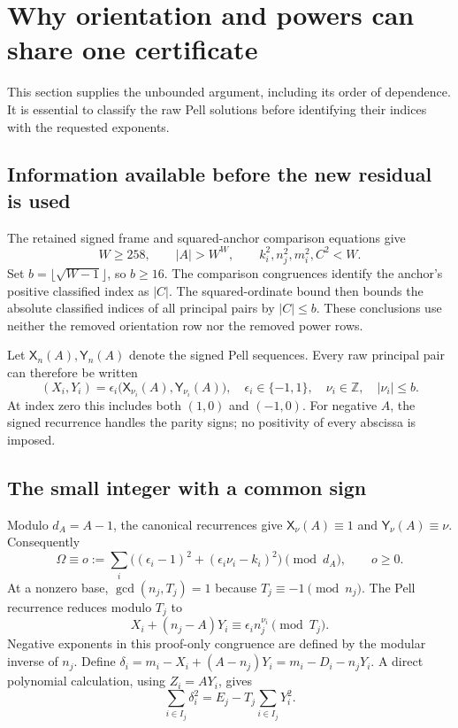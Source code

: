 \documentclass[11pt]{article}
\theoremstyle{definition}\newtheorem{definition}[theorem]{Definition}
\theoremstyle{remark}\newtheorem{remark}[theorem]{Remark}
\newcommand{\Z}{\mathbb Z}\newcommand{\N}{\mathbb N}
\begin{document}
\section{Why orientation and powers can share one certificate}
\label{sec:jointproof}

This section supplies the unbounded argument, including its order of
dependence. It is essential to classify the raw Pell solutions before
identifying their indices with the requested exponents.

\subsection{Information available before the new residual is used}
The retained signed frame and squared-anchor comparison equations give
\[
 W\geq258,\qquad |A|>W^W,\qquad
 k_i^2,n_j^2,m_i^2,C^2<W.
\]
Set $b=\lfloor\sqrt{W-1}\rfloor$, so $b\geq16$. The comparison
congruences identify the anchor's positive classified index as $|C|$.
The squared-ordinate bound then bounds the absolute classified indices
of all principal pairs by $|C|\leq b$. These conclusions use neither
the removed orientation row nor the removed power rows.

Let $\mathsf X_n(A),\mathsf Y_n(A)$ denote the signed Pell sequences.
Every raw principal pair can therefore be written
\begin{equation}
 (X_i,Y_i)=\epsilon_i\bigl(\mathsf X_{\nu_i}(A),
                              \mathsf Y_{\nu_i}(A)\bigr),
 \quad \epsilon_i\in\{-1,1\},\quad \nu_i\in\Z,
 \quad |\nu_i|\leq b.
 \label{eq:raw}
\end{equation}
At index zero this includes both $(1,0)$ and $(-1,0)$.
For negative $A$, the signed recurrence handles the parity signs; no
positivity of every abscissa is imposed.

\subsection{The small integer with a common sign}
Modulo $d_A=A-1$, the canonical recurrences give
$\mathsf X_\nu(A)\equiv1$ and
$\mathsf Y_\nu(A)\equiv\nu$. Consequently
\begin{equation}
 \Omega\equiv o:=\sum_i\bigl((\epsilon_i-1)^2+
                         (\epsilon_i\nu_i-k_i)^2\bigr)
 \pmod {d_A},\qquad o\geq0.
 \label{eq:o}
\end{equation}
At a nonzero base, $\gcd(n_j,T_j)=1$ because $T_j\equiv-1\pmod{n_j}$.
The Pell recurrence reduces modulo $T_j$ to
\[
 X_i+(n_j-A)Y_i\equiv\epsilon_i n_j^{\nu_i}\pmod{T_j}.
\]
Negative exponents in this proof-only congruence are defined by the
modular inverse of $n_j$. Define
$\delta_i=m_i-X_i+(A-n_j)Y_i=m_i-D_i-n_jY_i$.
A direct polynomial calculation, using $Z_i=AY_i$, gives
\begin{equation}
 \sum_{i\in I_j}\delta_i^2
     =E_j-T_j\sum_{i\in I_j}Y_i^2.
 \label{eq:squareidentity}
\end{equation}
\end{document}
